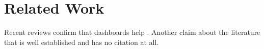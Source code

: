 \section{Related Work}

Recent reviews confirm that dashboards help \citep{Jones2019,Missing2020}. Another claim about the literature that is well established and has no citation at all.
